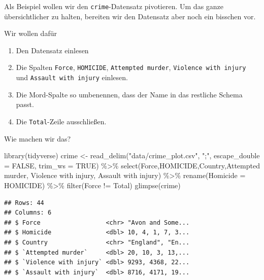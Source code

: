 \documentclass[
]{book}
\newenvironment{Shaded}{\begin{snugshade}}{\end{snugshade}}
\newcommand{\AttributeTok}[1]{\textcolor[rgb]{0.77,0.63,0.00}{#1}}
\newcommand{\ConstantTok}[1]{\textcolor[rgb]{0.00,0.00,0.00}{#1}}
\newcommand{\FunctionTok}[1]{\textcolor[rgb]{0.00,0.00,0.00}{#1}}
\newcommand{\NormalTok}[1]{#1}
\newcommand{\OtherTok}[1]{\textcolor[rgb]{0.56,0.35,0.01}{#1}}
\newcommand{\SpecialCharTok}[1]{\textcolor[rgb]{0.00,0.00,0.00}{#1}}
\newcommand{\StringTok}[1]{\textcolor[rgb]{0.31,0.60,0.02}{#1}}
\providecommand{\tightlist}{%
  \setlength{\itemsep}{0pt}\setlength{\parskip}{0pt}}
\begin{document}
Als Beispiel wollen wir den \texttt{\textquotesingle{}crime\textquotesingle{}}-Datensatz pivotieren. Um das ganze übersichtlicher zu halten, bereiten wir den Datensatz aber noch ein bisschen vor.

Wir wollen dafür

\begin{enumerate}
\def\labelenumi{\arabic{enumi}.}
\tightlist
\item
  Den Datensatz einlesen
\item
  Die Spalten \texttt{Force}, \texttt{HOMICIDE}, \texttt{Attempted\ murder}, \texttt{Violence\ with\ injury} und \texttt{Assault\ with\ injury} einlesen.
\item
  Die Mord-Spalte so umbenennen, dass der Name in das restliche Schema passt.
\item
  Die \texttt{Total}-Zeile ausschließen.
\end{enumerate}

Wie machen wir das?

\begin{Shaded}
\begin{Highlighting}[]
\FunctionTok{library}\NormalTok{(tidyverse)}
\NormalTok{crime }\OtherTok{\textless{}{-}} \FunctionTok{read\_delim}\NormalTok{(}\StringTok{"data/crime\_plot.csv"}\NormalTok{, }
                    \StringTok{";"}\NormalTok{, }\AttributeTok{escape\_double =} \ConstantTok{FALSE}\NormalTok{, }\AttributeTok{trim\_ws =} \ConstantTok{TRUE}\NormalTok{) }\SpecialCharTok{\%\textgreater{}\%} 
  \FunctionTok{select}\NormalTok{(Force,HOMICIDE,Country,}\StringTok{\textasciigrave{}}\AttributeTok{Attempted murder}\StringTok{\textasciigrave{}}\NormalTok{, }
         \StringTok{\textasciigrave{}}\AttributeTok{Violence with injury}\StringTok{\textasciigrave{}}\NormalTok{, }\StringTok{\textasciigrave{}}\AttributeTok{Assault with injury}\StringTok{\textasciigrave{}}\NormalTok{) }\SpecialCharTok{\%\textgreater{}\%} 
  \FunctionTok{rename}\NormalTok{(}\StringTok{\textquotesingle{}Homicide\textquotesingle{}} \OtherTok{=} \StringTok{\textquotesingle{}HOMICIDE\textquotesingle{}}\NormalTok{) }\SpecialCharTok{\%\textgreater{}\%} 
  \FunctionTok{filter}\NormalTok{(Force }\SpecialCharTok{!=} \StringTok{\textquotesingle{}Total\textquotesingle{}}\NormalTok{)}
\FunctionTok{glimpse}\NormalTok{(crime)}
\end{Highlighting}
\end{Shaded}

\begin{verbatim}
## Rows: 44
## Columns: 6
## $ Force                  <chr> "Avon and Some...
## $ Homicide               <dbl> 10, 4, 1, 7, 3...
## $ Country                <chr> "England", "En...
## $ `Attempted murder`     <dbl> 20, 10, 3, 13,...
## $ `Violence with injury` <dbl> 9293, 4368, 22...
## $ `Assault with injury`  <dbl> 8716, 4171, 19...
\end{verbatim}
\end{document}
